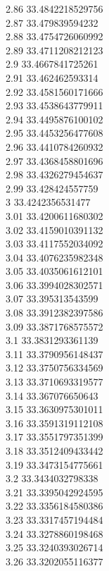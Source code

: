 {2.86	33.4842218529756\\
2.87	33.479839594232\\
2.88	33.4754726060992\\
2.89	33.4711208212123\\
2.9	33.4667841725261\\
2.91	33.462462593314\\
2.92	33.4581560171666\\
2.93	33.4538643779911\\
2.94	33.4495876100102\\
2.95	33.4453256477608\\
2.96	33.4410784260932\\
2.97	33.4368458801696\\
2.98	33.4326279454637\\
2.99	33.428424557759\\
3	33.4242356531477\\
3.01	33.4200611680302\\
3.02	33.4159010391132\\
3.03	33.4117552034092\\
3.04	33.4076235982348\\
3.05	33.4035061612101\\
3.06	33.3994028302571\\
3.07	33.395313543599\\
3.08	33.3912382397586\\
3.09	33.3871768575572\\
3.1	33.3831293361139\\
3.11	33.3790956148437\\
3.12	33.3750756334569\\
3.13	33.3710693319577\\
3.14	33.367076650643\\
3.15	33.3630975301011\\
3.16	33.3591319112108\\
3.17	33.3551797351399\\
3.18	33.3512409433442\\
3.19	33.3473154775661\\
3.2	33.3434032798338\\
3.21	33.3395042924595\\
3.22	33.3356184580386\\
3.23	33.3317457194484\\
3.24	33.3278860198468\\
3.25	33.3240393026714\\
3.26	33.3202055116377\\
}
